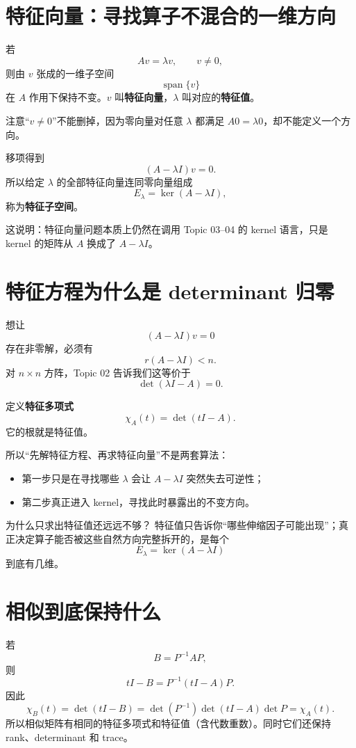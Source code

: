 \documentclass[11pt,a4paper]{ctexart}
\newcommand{\kw}[1]{\textbf{\color{deep}#1}}
\begin{document}
\section{特征向量：寻找算子不混合的一维方向}

若
\[
Av=\lambda v,
\qquad v\neq0,
\]
则由 $v$ 张成的一维子空间
\[
\operatorname{span}\{v\}
\]
在 $A$ 作用下保持不变。$v$ 叫\kw{特征向量}，$\lambda$ 叫对应的\kw{特征值}。

注意“$v\neq0$”不能删掉，因为零向量对任意 $\lambda$ 都满足 $A0=\lambda0$，却不能定义一个方向。

移项得到
\[
(A-\lambda I)v=0.
\]
所以给定 $\lambda$ 的全部特征向量连同零向量组成
\[
\boxed{E_\lambda=\ker(A-\lambda I),}
\]
称为\kw{特征子空间}。

这说明：特征向量问题本质上仍然在调用 Topic 03--04 的 kernel 语言，只是 kernel 的矩阵从 $A$ 换成了 $A-\lambda I$。

\section{特征方程为什么是 determinant 归零}

想让
\[
(A-\lambda I)v=0
\]
存在非零解，必须有
\[
r(A-\lambda I)<n.
\]
对 $n\times n$ 方阵，Topic 02 告诉我们这等价于
\[
\boxed{\det(\lambda I-A)=0.}
\]

定义\kw{特征多项式}
\[
\chi_A(t)=\det(tI-A).
\]
它的根就是特征值。

所以“先解特征方程、再求特征向量”不是两套算法：
\begin{itemize}
  \item 第一步只是在寻找哪些 $\lambda$ 会让 $A-\lambda I$ 突然失去可逆性；
  \item 第二步真正进入 kernel，寻找此时暴露出的不变方向。
\end{itemize}

\begin{methodbox}{为什么只求出特征值还远远不够？}
特征值只告诉你“哪些伸缩因子可能出现”；真正决定算子能否被这些自然方向完整拆开的，是每个
\[
E_\lambda=\ker(A-\lambda I)
\]
到底有几维。
\end{methodbox}

\section{相似到底保持什么}

若
\[
B=P^{-1}AP,
\]
则
\[
tI-B=P^{-1}(tI-A)P.
\]
因此
\[
\chi_B(t)
=\det(tI-B)
=\det(P^{-1})\det(tI-A)\det P
=\chi_A(t).
\]
所以相似矩阵有相同的特征多项式和特征值（含代数重数）。同时它们还保持 rank、determinant 和 trace。
\end{document}
